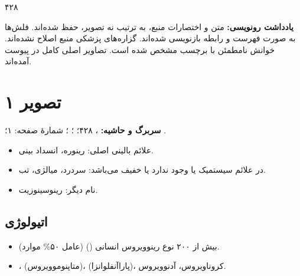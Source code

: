 \documentclass[12pt,a4paper]{article}
\begin{document}
\fi
\providecommand{\CCunclear}[1]{\textbf{[خوانش نامطمئن: #1]}}
\providecommand{\CCpage}[2]{\clearpage\section*{تصویر #1}\lr{\texttt{#2}}\par
  \textbf{سربرگ و حاشیه:} ۴۲۸؛ \lr{Subject:} (خالی)؛ \lr{Date: / /}؛ شمارهٔ صفحه: #1؛ نشان پایین برگه: \lr{YASHA}.\par}
\providecommand{\CCrange}[2]{\lr{#1--#2}}
\begin{center}
{\Large\bfseries {}}\par
{}\par
۴۲۸
\end{center}
\textbf{یادداشت رونویسی:} متن و اختصارات منبع، به ترتیب نه تصویر، حفظ شده‌اند. فلش‌ها به صورت فهرست و رابطه بازنویسی شده‌اند. گزاره‌های پزشکی منبع اصلاح نشده‌اند. خوانش نامطمئن با برچسب مشخص شده است. تصاویر اصلی کامل در پیوست آمده‌اند.

\clearpage\section*{تصویر ۱}\par
\textbf{سربرگ و حاشیه:} ، ۴۲۸؛ ؛ ؛ شمارهٔ صفحه: ۱؛ .
\begin{itemize}
\item علائم بالینی اصلی: رینوره، انسداد بینی.
\item در  علائم سیستمیک یا وجود ندارد یا خفیف می‌باشد: سردرد، میالژی، تب.
\item نام دیگر: رینوسینوزیت.
\end{itemize}
\subsection*{اتیولوژی}
\begin{itemize}
\item بیش از ۲۰۰ نوع رینوویروس انسانی () (عامل ۵۰\% موارد).
\item {}،  (متاپنوموویروس)،  (پاراآنفلوانزا)، کروناویروس، آدنوویروس.
\end{itemize}
\end{document}
